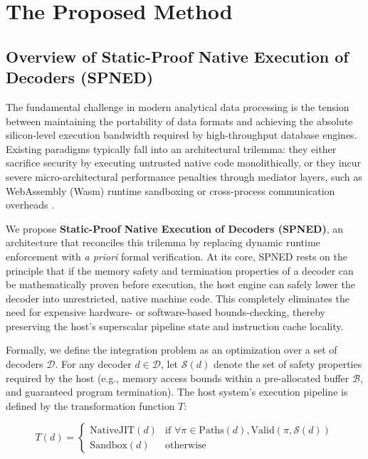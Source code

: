 \documentclass[onecolumn]{IEEEtran}
\numberwithin{equation}{section}
\theoremstyle{definition}
\theoremstyle{remark}
\begin{document}
\section{The Proposed Method}

\subsection{Overview of Static-Proof Native Execution of Decoders (SPNED)}

The fundamental challenge in modern analytical data processing is the tension between maintaining the portability of data formats and achieving the absolute silicon-level execution bandwidth required by high-throughput database engines. Existing paradigms typically fall into an architectural trilemma: they either sacrifice security by executing untrusted native code monolithically, or they incur severe micro-architectural performance penalties through mediator layers, such as WebAssembly (Wasm) runtime sandboxing \cite{gienieczko2025anyblox, bytecode2019wasmtime} or cross-process communication overheads \cite{saur2022containerized}. 

We propose \textbf{Static-Proof Native Execution of Decoders (SPNED)}, an architecture that reconciles this trilemma by replacing dynamic runtime enforcement with \textit{a priori} formal verification. At its core, SPNED rests on the principle that if the memory safety and termination properties of a decoder can be mathematically proven before execution, the host engine can safely lower the decoder into unrestricted, native machine code. This completely eliminates the need for expensive hardware- or software-based bounds-checking, thereby preserving the host's superscalar pipeline state and instruction cache locality.

Formally, we define the integration problem as an optimization over a set of decoders $\mathcal{D}$. For any decoder $d \in \mathcal{D}$, let $\mathcal{S}(d)$ denote the set of safety properties required by the host (e.g., memory access bounds within a pre-allocated buffer $\mathcal{B}$, and guaranteed program termination). The host system's execution pipeline is defined by the transformation function $T$:

\begin{equation}
    T(d) = \begin{cases} 
        \text{NativeJIT}(d) & \text{if } \forall \pi \in \text{Paths}(d), \text{Valid}(\pi, \mathcal{S}(d)) \\ 
        \text{Sandbox}(d) & \text{otherwise} 
    \end{cases}
\end{equation}
\end{document}
